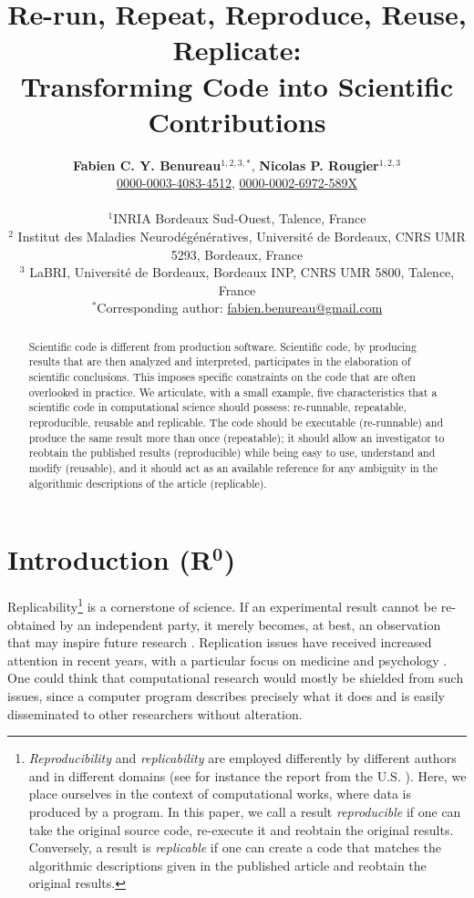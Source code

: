 \documentclass[a4paper,11pt]{article}
\title{Re-run, Repeat, Reproduce, Reuse, Replicate:\\Transforming Code into Scientific Contributions}
\author{
  \textbf{Fabien C. Y. Benureau}$^{1,2,3,*}$,
  \textbf{Nicolas P. Rougier}$^{1,2,3}$\\
  {\small \href{https://orcid.org/0000-0003-4083-4512}{0000-0003-4083-4512},
  \href{https://orcid.org/0000-0002-6972-589X}{0000-0002-6972-589X}}\\
  \begin{minipage}{0.8\textwidth}
    \begin{center}
      \vspace{2mm}
      \scriptsize
      $^{1}$INRIA Bordeaux Sud-Ouest, Talence, France\\
      $^{2}$ Institut des Maladies Neurodégénératives, Université de Bordeaux, CNRS UMR 5293, Bordeaux, France\\
      $^{3}$ LaBRI, Université de Bordeaux, Bordeaux INP, CNRS UMR 5800, Talence, France\\
      \vspace{2mm}
      $^{*}$Corresponding author:
      \href{mailto:fabien.benureau@gmail.com}{fabien.benureau@gmail.com}
    \end{center}
  \end{minipage}
}
\date{}
\begin{document}
\vfill
\maketitle

\begin{abstract}
  Scientific code is different from production software. Scientific code, by producing results that are then analyzed and interpreted, participates in the elaboration of scientific conclusions. This imposes specific constraints on the code that are often overlooked in practice. We articulate, with a small example, five characteristics that a scientific code in computational science should possess: re-runnable, repeatable, reproducible, reusable and replicable. The code should be executable (re-runnable) and produce the same result more than once (repeatable); it should allow an investigator to reobtain the published results (reproducible) while being easy to use, understand and modify (reusable), and it should act as an available reference for any ambiguity in the algorithmic descriptions of the article (replicable).
\end{abstract}
\vfill


\pagebreak
\section*{Introduction (R$^{\mathbf 0}$)}

Replicability\footnote{\emph{Reproducibility} and \emph{replicability} are employed differently by different authors and in different domains (see for instance the report from the U.S.  \cite{Schwalbe:2016}). Here, we place ourselves in the context of computational works, where data is produced by a program. In this paper, we call a result \emph{reproducible} if one can take the original source code, re-execute it and reobtain the original results. Conversely, a result is \emph{replicable} if one can create a code that matches the algorithmic descriptions given in the published article and reobtain the original results.} is a cornerstone of science.  If an experimental result cannot be
re-obtained by an independent party, it merely becomes, at best, an observation
that may inspire future research \citep{Mesirov:2010,osc:2015}. Replication
issues have received increased attention in recent years, with a particular focus on medicine and psychology \citep{Iqbal:2016}. One could think
that computational research would mostly be shielded from such issues, since a
computer program describes precisely what it does and is easily
disseminated to other researchers without alteration.
\end{document}
